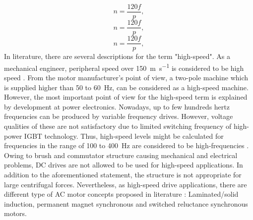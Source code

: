 \begin{equation}  \label{eq:speed}
  n = \frac{120 f}{p},
\end{equation}
\begin{equation}  \label{eq:speed}
  n = \frac{120 f}{p},
\end{equation}
\begin{equation}  \label{eq:speed}
  n = \frac{120 f}{p},
\end{equation}
In literature, there are several descriptions for the term "high-speed".  As a mechanical
engineer, peripheral speed over \SI{150}{\meter\per\second} is considered to be high speed
\cite{gieras2011performance}. From the motor manufacturer's point of view, a two-pole machine
which is supplied higher than 50 to \SI{60}{\hertz}, can be considered as a high-speed machine.
However, the most important point of view for the high-speed term is explained by development
at power electronics. Nowadays, up to few hundreds hertz frequencies can be produced by
variable frequency drives. However, voltage qualities of these are not satisfactory due to
limited switching frequency of high-power IGBT technology. Thus, high-speed levels might be
calculated for frequencies in the range of 100 to \SI{400}{\hertz} are considered to be
high-frequencies \cite{pyrhonen1991high}.  Owing to brush and commutator structure causing mechanical and
electrical problems, DC drives are not allowed to be used for high-speed applications. In
addition to the aforementioned statement, the structure is not appropriate for large
centrifugal forces.  Nevertheless, as high-speed drive applications, there are different type
of AC motor concepts proposed in literature
\cite{gieras2011performance, pyrhonen1991high, lahteenmaki2002design, saari1998thermal}:
Laminated/solid induction, permanent
magnet synchronous and switched reluctance synchronous motors.

